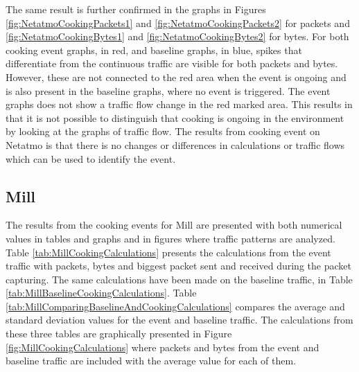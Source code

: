 The same result is further confirmed in the graphs in Figures \ref{fig:NetatmoCookingPackets1} and \ref{fig:NetatmoCookingPackets2} for packets and \ref{fig:NetatmoCookingBytes1} and \ref{fig:NetatmoCookingBytes2} for bytes. For both cooking event graphs, in red, and baseline graphs, in blue, spikes that differentiate from the continuous traffic are visible for both packets and bytes. However, these are not connected to the red area when the event is ongoing and is also present in the baseline graphs, where no event is triggered. The event graphs does not show a traffic flow change in the red marked area. This results in that it is not possible to distinguish that cooking is ongoing in the environment by looking at the graphs of traffic flow. The results from cooking event on Netatmo is that there is no changes or differences in calculations or traffic flows which can be used to identify the event.

\newpage
\subsection{Mill}
The results from the cooking events for Mill are presented with both numerical values in tables and graphs and in figures where traffic patterns are analyzed. Table \ref{tab:MillCookingCalculations} presents the calculations from the event traffic with packets, bytes and biggest packet sent and received during the packet capturing. The same calculations have been made on the baseline traffic, in Table \ref{tab:MillBaselineCookingCalculations}. Table \ref{tab:MillComparingBaselineAndCookingCalculations} compares the average and standard deviation values for the event and baseline traffic. The calculations from these three tables are graphically presented in Figure \ref{fig:MillCookingCalculations} where packets and bytes from the event and baseline traffic are included with the average value for each of them. 

